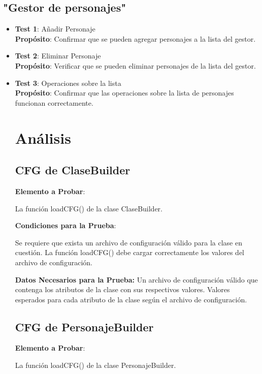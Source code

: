 \documentclass{article}
\begin{document}
\subsection{"Gestor de personajes"}
	\begin{itemize}


	\item \textbf{Test 1}: Añadir Personaje
\\ \textbf{Propósito}: Confirmar que se pueden agregar personajes a la lista del gestor.


	\item \textbf{Test 2}: Eliminar Personaje
\\ \textbf{Propósito}: Verificar que se pueden eliminar personajes de la lista del gestor.


	\item \textbf{Test 3}: Operaciones sobre la lista
\\ \textbf{Propósito}: Confirmar que las operaciones sobre la lista de personajes funcionan correctamente.

\newpage
\section{Análisis}
\subsection{CFG de ClaseBuilder}

\textbf{Elemento a Probar}: 

La función loadCFG() de la clase ClaseBuilder.

\textbf{Condiciones para la Prueba}:

        Se requiere que exista un archivo de configuración válido para la clase en cuestión.
        La función loadCFG() debe cargar correctamente los valores del archivo de configuración.
   
\textbf{ Datos Necesarios para la Prueba:}
        Un archivo de configuración válido que contenga los atributos de la clase con sus respectivos valores.
        Valores esperados para cada atributo de la clase según el archivo de configuración.

\subsection{CFG de PersonajeBuilder}

\textbf{Elemento a Probar}:

 La función loadCFG() de la clase PersonajeBuilder.


\end{itemize}
\end{document}
